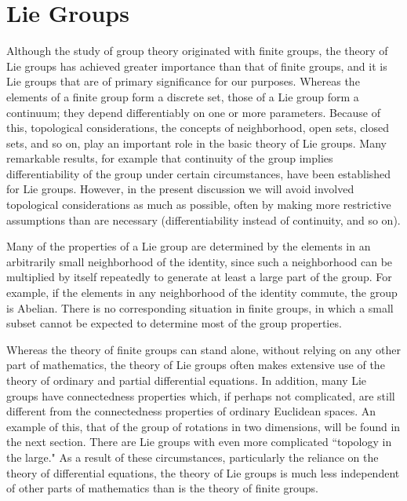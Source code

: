 \chapter{Lie Groups}


Although the study of group theory originated with finite groups, the theory of Lie groups has achieved greater importance than that of finite groups, and it is Lie groups that are of primary significance for our purposes. Whereas the elements of a finite group form a discrete set, those of a Lie group form a continuum; they depend differentiably on one or more parameters. Because of this, topological considerations, the concepts of neighborhood, open sets, closed sets, and so on, play an important role in the basic theory of Lie groups. Many remarkable results, for example that continuity of the group implies differentiability of the group under certain circumstances, have been established for Lie groups. However, in the present discussion we will avoid involved topological considerations as much as possible, often by making more restrictive assumptions than are necessary (differentiability instead of continuity, and so on).

Many of the properties of a Lie group are determined by the elements in an arbitrarily small neighborhood of the identity, since such a neighborhood can be multiplied by itself repeatedly to generate at least a large part of the group. For example, if the elements in any neighborhood of the identity commute, the group is Abelian. There is no corresponding situation in finite groups, in which a small subset cannot be expected to determine most of the group properties.

Whereas the theory of finite groups can stand alone, without relying on any other part of mathematics, the theory of Lie groups often makes extensive use of the theory of ordinary and partial differential equations. In addition, many Lie groups have connectedness properties which, if perhaps not complicated, are still different from the connectedness properties of ordinary Euclidean spaces. An example of this, that of the group of rotations in two dimensions, will be found in the next section. There are Lie groups with even more complicated ``topology in the large." As a result of these circumstances, particularly the reliance on the theory of differential equations, the theory of Lie groups is much less independent of other parts of mathematics than is the theory of finite groups.
%








\endinput